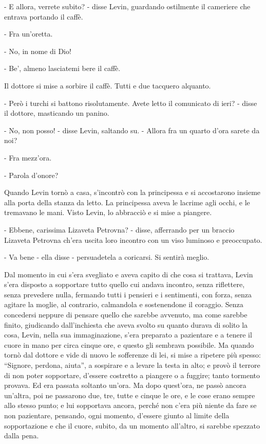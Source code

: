 - E allora, verrete subito? - disse Levin, guardando ostilmente il cameriere che entrava portando il caffè. 

- Fra un'oretta. 

- No, in nome di Dio! 

- Be', almeno lasciatemi bere il caffè. 

Il dottore si mise a sorbire il caffè. Tutti e due tacquero alquanto. 

- Però i turchi si battono risolutamente. Avete letto il comunicato di ieri? - disse il dottore, masticando un panino. 

- No, non posso! - disse Levin, saltando su. - Allora fra un quarto d'ora sarete da noi? 

- Fra mezz'ora. 

- Parola d'onore? 

Quando Levin tornò a casa, s'incontrò con la principessa e si accostarono insieme alla porta della stanza da letto. La principessa aveva le lacrime agli occhi, e le tremavano le mani. Visto Levin, lo abbracciò e si mise a piangere. 

- Ebbene, carissima Lizaveta Petrovna? - disse, afferrando per un braccio Lizaveta Petrovna ch'era uscita loro incontro con un viso luminoso e preoccupato. 

- Va bene - ella disse - persuadetela a coricarsi. Si sentirà meglio. 

Dal momento in cui s'era svegliato e aveva capito di che cosa si trattava, Levin s'era disposto a sopportare tutto quello cui andava incontro, senza riflettere, senza prevedere nulla, fermando tutti i pensieri e i sentimenti, con forza, senza agitare la moglie, al contrario, calmandola e sostenendone il coraggio. Senza concedersi neppure di pensare quello che sarebbe avvenuto, ma come sarebbe finito, giudicando dall'inchiesta che aveva svolto su quanto durava di solito la cosa, Levin, nella sua immaginazione, s'era preparato a pazientare e a tenere il cuore in mano per circa cinque ore, e questo gli sembrava possibile. Ma quando tornò dal dottore e vide di nuovo le sofferenze di lei, si mise a ripetere più spesso: ``Signore, perdona, aiuta'', a sospirare e a levare la testa in alto; e provò il terrore di non poter sopportare, d'essere costretto a piangere o a fuggire; tanto tormento provava. Ed era passata soltanto un'ora. Ma dopo quest'ora, ne passò ancora un'altra, poi ne passarono due, tre, tutte e cinque le ore, e le cose erano sempre allo stesso punto; e lui sopportava ancora, perché non c'era più niente da fare se non pazientare, pensando, ogni momento, d'essere giunto al limite della sopportazione e che il cuore, subito, da un momento all'altro, si sarebbe spezzato dalla pena. 

